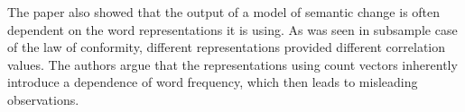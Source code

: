 \documentclass[a0,landscape]{a0poster}
\begin{document}
\begin{multicols}{4}
The paper also showed that the output of a model of semantic change is often dependent on the word representations it is using. As was seen in subsample case of the law of conformity, different representations provided different correlation values. The authors argue that the representations using count vectors inherently introduce a dependence of word frequency, which then leads to misleading observations.



\color{DarkSlateGray} %


\nocite{*} %


\end{multicols}
\end{document}
